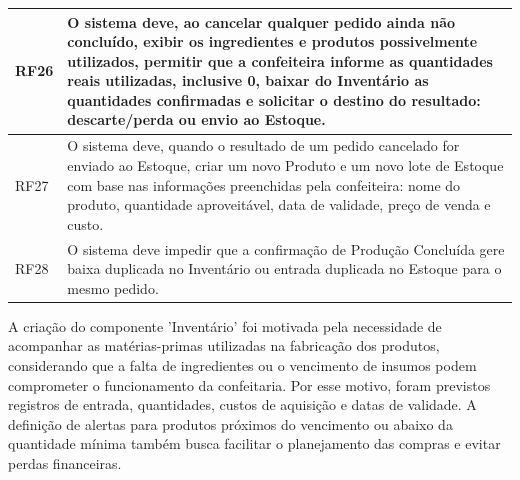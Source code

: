 \begin{quadro}
\begin{tabular}{|p{3cm}|p{11cm}|}
        RF26 & O sistema deve, ao cancelar qualquer pedido ainda não concluído, exibir os ingredientes e produtos possivelmente utilizados, permitir que a confeiteira informe as quantidades reais utilizadas, inclusive 0, baixar do Inventário as quantidades confirmadas e solicitar o destino do resultado: descarte/perda ou envio ao Estoque. \\ \hline

        RF27 & O sistema deve, quando o resultado de um pedido cancelado for enviado ao Estoque, criar um novo Produto e um novo lote de Estoque com base nas informações preenchidas pela confeiteira: nome do produto, quantidade aproveitável, data de validade, preço de venda e custo. \\ \hline

        RF28 & O sistema deve impedir que a confirmação de Produção Concluída gere baixa duplicada no Inventário ou entrada duplicada no Estoque para o mesmo pedido. \\ \hline

    \end{tabular}

    \vspace{0.2cm}
\end{quadro}

A criação do componente 'Inventário' foi motivada pela necessidade de acompanhar as matérias-primas utilizadas na fabricação dos produtos, considerando que a falta de ingredientes ou o vencimento de insumos podem comprometer o funcionamento da confeitaria. Por esse motivo, foram previstos registros de entrada, quantidades, custos de aquisição e datas de validade. A definição de alertas para produtos próximos do vencimento ou abaixo da quantidade mínima também busca facilitar o planejamento das compras e evitar perdas financeiras.

